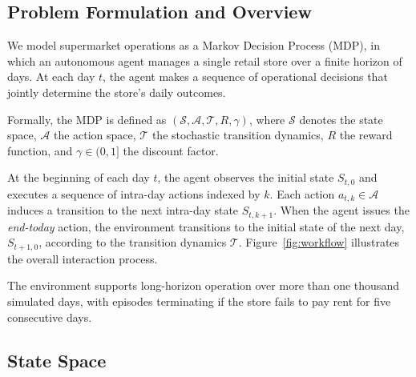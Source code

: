 \subsection{Problem Formulation and Overview}



We model supermarket operations as a Markov Decision Process (MDP), in which an autonomous agent manages a single retail store over a finite horizon of days. At each day $t$, the agent makes a sequence of operational decisions that jointly determine the store’s daily outcomes.

Formally, the MDP is defined as $(\mathcal{S}, \mathcal{A}, \mathcal{T}, R, \gamma)$,
where $\mathcal{S}$ denotes the state space, $\mathcal{A}$ the action space, $\mathcal{T}$ the stochastic transition dynamics, $R$ the reward function, and $\gamma \in (0,1]$ the discount factor.

At the beginning of each day $t$, the agent observes the initial state $S_{t,0}$ and executes a sequence of intra-day actions indexed by $k$. Each action $a_{t,k} \in \mathcal{A}$ induces a transition to the next intra-day state $S_{t,k+1}$. When the agent issues the \textit{end-today} action, the environment transitions to the initial state of the next day, $S_{t+1,0}$, according to the transition dynamics $\mathcal{T}$. Figure~\ref{fig:workflow} illustrates the overall interaction process.

The environment supports long-horizon operation over more than one thousand simulated days, with episodes terminating if the store fails to pay rent for five consecutive days.

\subsection{State Space}

